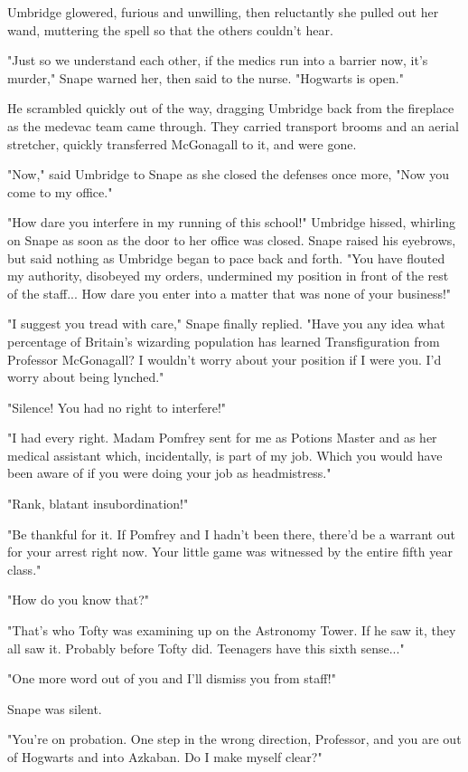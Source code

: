 Umbridge glowered, furious and unwilling, then reluctantly she pulled out her wand, muttering the spell so that the others couldn't hear.

"Just so we understand each other, if the medics run into a barrier now, it's murder," Snape warned her, then said to the nurse. "Hogwarts is open."

He scrambled quickly out of the way, dragging Umbridge back from the fireplace as the medevac team came through. They carried transport brooms and an aerial stretcher, quickly transferred McGonagall to it, and were gone.

"Now," said Umbridge to Snape as she closed the defenses once more, "Now you come to my office."

"How dare you interfere in my running of this school!" Umbridge hissed, whirling on Snape as soon as the door to her office was closed. Snape raised his eyebrows, but said nothing as Umbridge began to pace back and forth. "You have flouted my authority, disobeyed my orders, undermined my position in front of the rest of the staff... How dare you enter into a matter that was none of your business!"

"I suggest you tread with care," Snape finally replied. "Have you any idea what percentage of Britain's wizarding population has learned Transfiguration from Professor McGonagall? I wouldn't worry about your position if I were you. I'd worry about being lynched."

"Silence! You had no right to interfere!"

"I had every right. Madam Pomfrey sent for me as Potions Master and as her medical assistant which, incidentally, is part of my job. Which you would have been aware of if you were doing your job as headmistress."

"Rank, blatant insubordination!"

"Be thankful for it. If Pomfrey and I hadn't been there, there'd be a warrant out for your arrest right now. Your little game was witnessed by the entire fifth year class."

"How do you know that?"

"That's who Tofty was examining up on the Astronomy Tower. If he saw it, they all saw it. Probably before Tofty did. Teenagers have this sixth sense..."

"One more word out of you and I'll dismiss you from staff!"

Snape was silent.

"You're on probation. One step in the wrong direction, Professor, and you are out of Hogwarts and into Azkaban. Do I make myself clear?"

